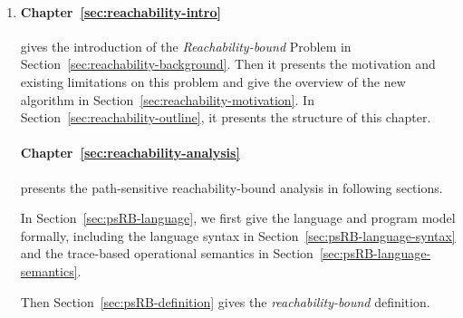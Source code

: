 \begin{enumerate}
    \paragraph{Chapter~\ref{sec:adapt-implementation}} presents five manual examples demonstrating this framework in Section~\ref{sec:adapt-example},
    and the experimental results on some real world data analysis algorithms in Section~\ref{sec:adapt-eval}.
    
    \paragraph{Chapter~\ref{sec:adapt-relatedwork}} discusses the related works from three perspectives:
    the semantics based dependency  analysis and formalization(Section~\ref{sec:relatedwork-adapt-semantics}), the static program analysis (Section~\ref{sec:relatedwork-adapt-static}), and the works about generalization error in adaptive data analysis (Section~\ref{sec:relatedwork-adapt-error}).  

    \item {}

    \paragraph{Chapter~\ref{sec:reachability-intro}} gives the introduction of the
    \emph{Reachability-bound} Problem in
    Section~\ref{sec:reachability-background}.
    Then it presents the motivation and existing limitations on this problem and give the overview of the new algorithm in
    Section~\ref{sec:reachability-motivation}.
    In Section~\ref{sec:reachability-outline}, it presents the structure of this chapter.

    \paragraph{Chapter~\ref{sec:reachability-analysis}} presents the {path-sensitive reachability-bound analysis} in following sections.

    In Section~{\ref{sec:psRB-language}}, we first give the language and program model formally, including the
    language syntax in Section~\ref{sec:psRB-language-syntax} and the trace-based operational semantics in Section~\ref{sec:psRB-language-semantics}.
    
    Then Section~\ref{sec:psRB-definition} gives the \emph{reachability-bound} definition.


\end{enumerate}
